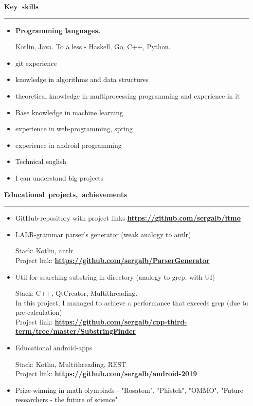 \documentclass[10pt, a4paper]{report}
\begin{document}
    \par\hbox{\large\textbf{Key skills}}\kern5pt\hrule\kern5pt

    \begin{itemize}

        \item \textbf{Programming languages.}

        Kotlin, Java. To a less - Haskell, Go, C++, Python.

        \item git experience
        \item knowledge in algorithms and data structures
        \item theoretical knowledge in multiprocessing programming and experience in it
        \item Base knowledge in machine learning
        \item experience in web-programming, spring
        \item experience in android programming
        \item Technical english
        \item I can understand big projects\\
    \end{itemize}

    \par\hbox{\large\textbf{Educational projects, achievements}}\kern5pt\hrule\kern5pt
    \begin{itemize}

        \item GitHub-repository with project links \textbf{\url{https://github.com/sergalb/itmo}}

        \item LALR-grammar parser's generator (weak analogy to  antlr)

        Stack: Kotlin, antlr\\
        Project link:
        \textbf{
        \url{https://github.com/sergalb/ParserGenerator}
        }

        \item Util for searching substring in directory (analogy to grep, with UI)

        Stack: C++, QtCreator, Multithreading.\\
        In this project, I managed to achieve a performance that exceeds grep (due to pre-calculation)\\
        Project link:
        \textbf{
        \url{https://github.com/sergalb/cpp-third-term/tree/master/SubstringFinder}
        }

        \item Educational android-apps

        Stack: Kotlin, Multithreading, REST\\
        Project link:
        \textbf{
        \url{https://github.com/sergalb/android-2019}
        }

        \item Prize-winning in math olympiads - "Rosatom", "Phisteh", "OMMO", "Future researchers - the future of science"

    \end{itemize}
\end{document}
